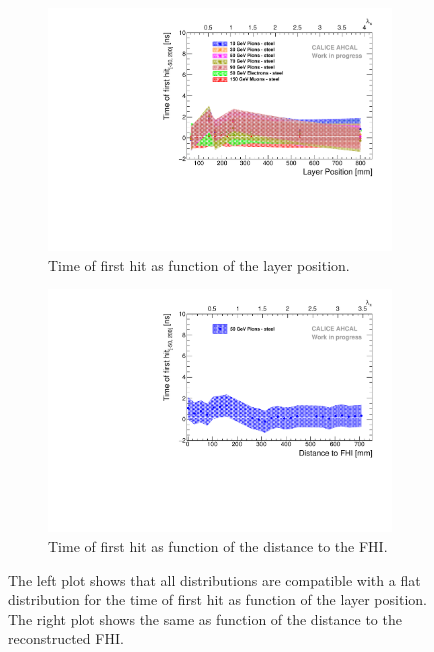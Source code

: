 \begin{figure}[htbp!]
	\begin{subfigure}[t]{0.5\textwidth}
		\centering
		\includegraphics[width=1\textwidth]{../Thesis_Plots/Timing/Pions/Plots/Timing_Depth_Comparison_ShortAsymRange.pdf}
		\caption{Time of first hit as function of the layer position.} \label{fig:Depth_Comparison}
	\end{subfigure}
	\hfill
	\begin{subfigure}[t]{0.5\textwidth}
		\centering
		\includegraphics[width=1\textwidth]{../Thesis_Plots/Timing/Pions/Plots/Timing_Depth_Comparison_ShortAsymRange_ShowerStart.pdf}
		\caption{Time of first hit as function of the distance to the FHI.}\label{fig:Depth_Comparison_FHI}
	\end{subfigure}
	\caption{The left plot shows that all distributions are compatible with a flat distribution for the time of first hit as function of the layer position. The right plot shows the same as function of the distance to the reconstructed FHI.}
	\label{fig:DepthProfile}
\end{figure}

